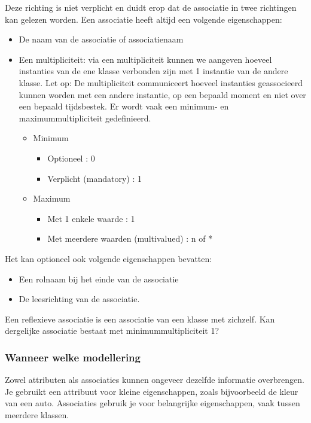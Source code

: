Deze richting is niet verplicht en duidt erop dat de associatie in twee richtingen kan gelezen
worden.  Een associatie heeft altijd een volgende eigenschappen:
\begin{itemize}
	\item De naam van de associatie of associatienaam
	\item Een multipliciteit: via een multipliciteit kunnen we aangeven hoeveel instanties van de ene klasse verbonden zijn met 1 instantie van de andere klasse. Let op: De multipliciteit communiceert hoeveel instanties geassocieerd kunnen worden met een andere instantie, op een bepaald moment en niet over een bepaald tijdsbestek. Er wordt vaak een minimum- en maximummultipliciteit gedefinieerd.
	
\begin{itemize}
	\item Minimum
			\begin{itemize}
			\item Optioneel : 0
			\item Verplicht (mandatory) : 1
		\end{itemize}
	\item Maximum
	\begin{itemize}
		\item Met 1 enkele waarde : 1
		\item Met meerdere waarden (multivalued) : n of *
	\end{itemize}
\end{itemize}

\end{itemize}

Het kan optioneel ook volgende eigenschappen bevatten:
\begin{itemize}
	\item Een rolnaam bij het einde van de associatie
	\item De leesrichting van de associatie.
\end{itemize}

\begin{exercise}
	Een reflexieve associatie is een associatie van een klasse met zichzelf. Kan dergelijke
	associatie bestaat met minimummultipliciteit 1? 
\end{exercise}

\subsubsection{Wanneer welke modellering}
Zowel attributen als associaties kunnen ongeveer dezelfde informatie overbrengen.
Je gebruikt een attribuut voor kleine eigenschappen, zoals bijvoorbeeld de kleur van 
een auto. Associaties gebruik je voor belangrijke eigenschappen, vaak tussen meerdere
klassen.


